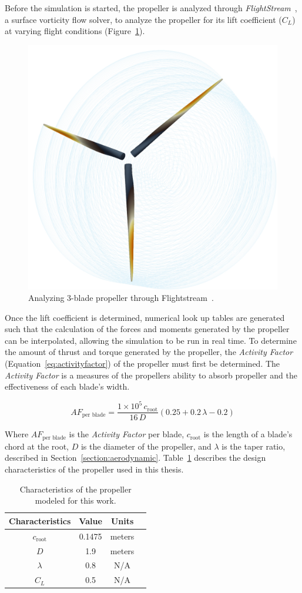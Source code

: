\documentclass[12pt]{report}
\begin{document}
Before the simulation is started, the propeller is analyzed through \textit{FlightStream}~\cite{FlightStream}, a surface vorticity flow solver, to analyze the propeller for its lift coefficient (\(C_L\)) at varying flight conditions (Figure~\ref{fig:flightstreamprop}).

\begin{figure}[!ht]\label{fig:flightstreamprop}
  \centering
  \includegraphics[width=.35\linewidth]{Figures/flightstreamprop.png}
  \caption{Analyzing 3-blade propeller through Flightstream~\cite{FlightStream}.}
\end{figure}

Once the lift coefficient is determined, numerical look up tables are generated such that the calculation of the forces and moments generated by the propeller can be interpolated, allowing the simulation to be run in real time. To determine the amount of thrust and torque generated by the propeller, the \textit{Activity Factor} (Equation~\ref{eq:activityfactor}) of the propeller must first be determined. The \textit{Activity Factor} is a measures of the propellers ability to absorb propeller and the effectiveness of each blade's width.

\begin{equation}\label{eq:activityfactor}
  AF_{\textrm{per blade}} = \frac{1 \times 10^5 \, c_{\textrm{root}}}{16 \, D} \left(0.25 + 0.2 \, \lambda - 0.2 \right)
\end{equation}

Where \(AF_{\textrm{per blade}}\) is the \textit{Activity Factor} per blade, \(c_{\textrm{root}}\) is the length of a blade's chord at the root, \(D\) is the diameter of the propeller, and \( \lambda \) is the taper ratio, described in Section~\ref{section:aerodynamic}. Table~\ref{tbl:propparams} describes the design characteristics of the propeller used in this thesis.

\begin{table}[!ht]\label{tbl:propparams}
  \caption{Characteristics of the propeller modeled for this work.}
  \centering
  \begin{tabular}{cccc}
    \toprule
    Characteristics       & Value  & Units  \\
    \midrule
    \(c_{\textrm{root}}\) & 0.1475 & meters \\
    \(D\)                 & 1.9    & meters \\
    \( \lambda \)         & 0.8    & N/A    \\
    \(C_L\)               & 0.5    & N/A    \\
    \bottomrule
  \end{tabular}
\end{table}
\end{document}
